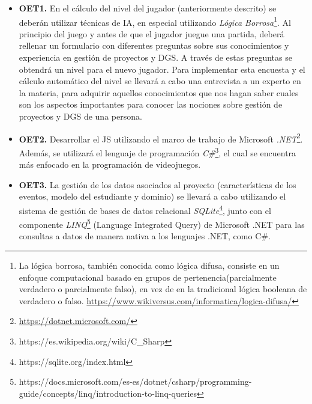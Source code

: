 \begin{itemize}
	\item \textbf{OET1.} En el cálculo del nivel del jugador (anteriormente descrito) se deberán utilizar técnicas de IA, en especial utilizando \emph{Lógica Borrosa}\footnote{La lógica borrosa, también conocida como lógica difusa, consiste en un enfoque computacional basado en grupos de pertenencia(parcialmente verdadero o parcialmente falso), en vez de en la tradicional lógica booleana de verdadero o falso. \url{https://www.wikiversus.com/informatica/logica-difusa/}}. Al principio del juego y antes de que el jugador juegue una partida, deberá rellenar un formulario con diferentes preguntas sobre sus conocimientos y experiencia en gestión de proyectos y DGS. A través de estas preguntas se obtendrá un nivel para el nuevo jugador. Para implementar esta encuesta y el cálculo automático del nivel se llevará a cabo una entrevista a un experto en la materia, para adquirir aquellos conocimientos que nos hagan saber cuales son los aspectos importantes para conocer las nociones sobre gestión de proyectos y DGS de una persona.
	
	\item \textbf{OET2.} Desarrollar el JS utilizando el marco de trabajo de Microsoft \emph{.NET}\footnote{\url{https://dotnet.microsoft.com/}}. Además, se utilizará el lenguaje de programación \emph{C\#}\footnote{https://es.wikipedia.org/wiki/C\_Sharp}, el cual se encuentra más enfocado en la programación de videojuegos.
	
	\item \textbf{OET3.} La gestión de los datos asociados al proyecto (características de los eventos, modelo del estudiante y dominio) se llevará a cabo utilizando el sistema de gestión de bases de datos relacional \emph{SQLite}\footnote{https://sqlite.org/index.html}, junto con el componente \emph{LINQ}\footnote{https://docs.microsoft.com/es-es/dotnet/csharp/programming-guide/concepts/linq/introduction-to-linq-queries} (Language Integrated Query) de Microsoft .NET para las consultas a datos de manera nativa a los lenguajes .NET, como C\#.
\end{itemize}


